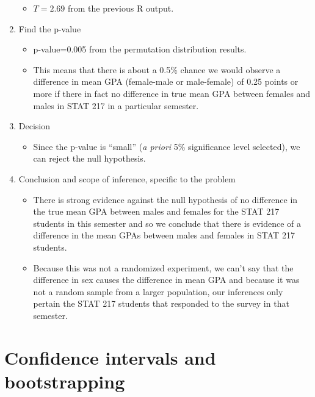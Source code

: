 \documentclass[]{book}
\providecommand{\tightlist}{%
  \setlength{\itemsep}{0pt}\setlength{\parskip}{0pt}}
\begin{document}
\begin{enumerate}
  \begin{itemize}
  \tightlist
  \item
    \(T=2.69\) from the previous R output.
  \end{itemize}
\item
  Find the p-value

  \begin{itemize}
  \item
    p-value=0.005 from the permutation distribution results.
  \item
    This means that there is about a 0.5\% chance we would observe a
    difference in mean GPA (female-male or male-female) of 0.25 points
    or more if there in fact no difference in true mean GPA between
    females and males in STAT 217 in a particular semester.
  \end{itemize}
\item
  Decision

  \begin{itemize}
  \tightlist
  \item
    Since the p-value is ``small'' (\emph{a priori} 5\% significance
    level selected), we can reject the null hypothesis.
  \end{itemize}
\item
  Conclusion and scope of inference, specific to the problem

  \begin{itemize}
  \item
    There is strong evidence against the null hypothesis of no
    difference in the true mean GPA between males and females for the
    STAT 217 students in this semester and so we conclude that there is
    evidence of a difference in the mean GPAs between males and females
    in STAT 217 students.
  \item
    Because this was not a randomized experiment, we can't say that the
    difference in sex causes the difference in mean GPA and because it
    was not a random sample from a larger population, our inferences
    only pertain the STAT 217 students that responded to the survey in
    that semester.
  \end{itemize}
\end{enumerate}

\section{Confidence intervals and bootstrapping}\label{section2-8}
\end{document}
